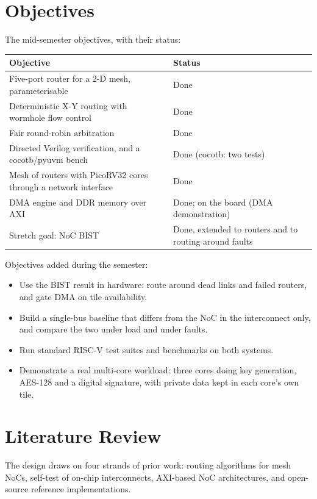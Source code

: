 \documentclass[11pt,a4paper]{article}
\begin{document}
\section{Objectives}

The mid-semester objectives, with their status:

\begin{tabularx}{\textwidth}{@{}Yl@{}}
\toprule
\textbf{Objective} & \textbf{Status} \\
\midrule
Five-port router for a 2-D mesh, parameterisable & Done \\
Deterministic X-Y routing with wormhole flow control & Done \\
Fair round-robin arbitration & Done \\
Directed Verilog verification, and a cocotb/pyuvm bench & Done (cocotb: two tests) \\
Mesh of routers with PicoRV32 cores through a network interface & Done \\
DMA engine and DDR memory over AXI & Done; on the board (DMA demonstration) \\
Stretch goal: NoC BIST & Done, extended to routers and to routing around faults \\
\bottomrule
\end{tabularx}

Objectives added during the semester:
\begin{itemize}
\item Use the BIST result in hardware: route around dead links and failed
      routers, and gate DMA on tile availability.
\item Build a single-bus baseline that differs from the NoC in the
      interconnect only, and compare the two under load and under faults.
\item Run standard RISC-V test suites and benchmarks on both systems.
\item Demonstrate a real multi-core workload: three cores doing key
      generation, AES-128 and a digital signature, with private data kept in
      each core's own tile.
\end{itemize}

\section{Literature Review}

The design draws on four strands of prior work: routing algorithms for mesh
NoCs, self-test of on-chip interconnects, AXI-based NoC architectures, and
open-source reference implementations.
\end{document}
